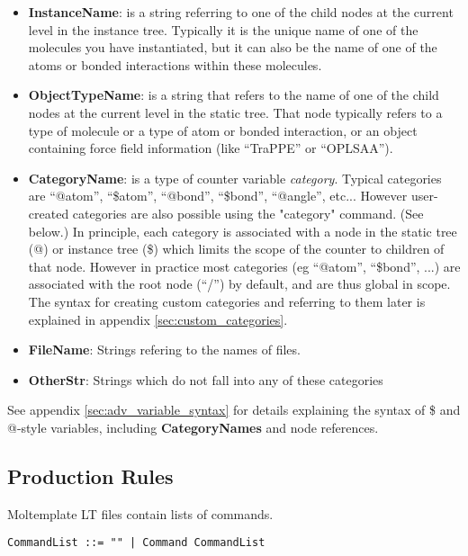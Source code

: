\documentclass[11pt]{article}
\begin{document}
\begin{itemize}
\item \textbf{InstanceName}: is a string referring to one of the child nodes at the current level in the instance tree.  Typically it is the unique name of one of the molecules you have instantiated, but it can also be the name of one of the atoms or bonded interactions within these molecules.

\item \textbf{ObjectTypeName}: is a string that refers to the name of one of the child nodes at the current level in the static tree.  That node typically refers to a type of molecule or a type of atom or bonded interaction, or an object containing force field information (like ``TraPPE'' or ``OPLSAA'').

\item \textbf{CategoryName}: is a type of counter variable \textit{category}.  Typical categories are ``@atom'', ``\$atom'', ``@bond'', ``\$bond'', ``@angle'', etc...  However user-created categories are also possible using the "category" command. (See below.)  In principle, each category is associated with a node in the static tree (@) or instance tree (\$) which limits the scope of the counter to children of that node.  However in practice most categories (eg ``@atom'', ``\$bond'', ...) are associated with the root node (``/'') by default, and are thus global in scope.  The syntax for creating custom categories and referring to them later is explained in appendix \ref{sec:custom_categories}.

\item \textbf{FileName}: Strings refering to the names of files.

\item \textbf{OtherStr}: Strings which do not fall into any of these categories
\end{itemize}

See appendix \ref{sec:adv_variable_syntax} for details explaining the syntax of
\$ and @-style variables, including \textbf{CategoryNames} and node references.


\subsection*{Production Rules}

Moltemplate LT files contain lists of commands.

\begin{verbatim}
CommandList ::= "" | Command CommandList
\end{verbatim}
\end{document}
